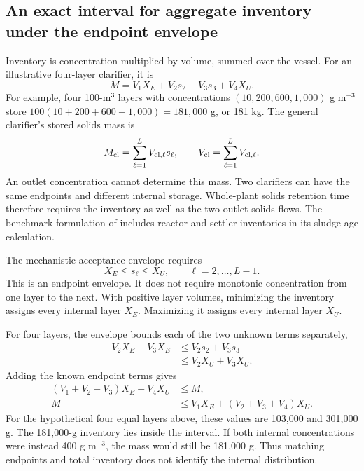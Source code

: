 \subsection{An exact interval for aggregate inventory under the endpoint envelope}

Inventory is concentration multiplied by volume, summed over the vessel. For an illustrative four-layer clarifier, it is
\begin{equation}
M=V_1X_E+V_2s_2+V_3s_3+V_4X_U.
\end{equation}
For example, four 100-m$^3$ layers with concentrations $(10,200,600,1{,}000)$ g m$^{-3}$ store $100(10+200+600+1{,}000)=181{,}000$ g, or 181 kg. The general clarifier's stored solids mass is
\begin{equation}
M_{\rm cl}=\sum_{\ell=1}^{L}V_{{\rm cl},\ell}s_\ell,\qquad
V_{\rm cl}=\sum_{\ell=1}^{L}V_{{\rm cl},\ell}.
\label{eq:plant_inventory_definition}
\end{equation}
An outlet concentration cannot determine this mass. Two clarifiers can have the same endpoints and different internal storage. Whole-plant solids retention time therefore requires the inventory as well as the two outlet solids flows. The benchmark formulation of \citet{Alex2008} includes reactor and settler inventories in its sludge-age calculation.

The mechanistic acceptance envelope requires
\begin{equation}
X_E\le s_\ell\le X_U,\qquad \ell=2,\ldots,L-1.
\label{eq:plant_layer_envelope}
\end{equation}
This is an endpoint envelope. It does not require monotonic concentration from one layer to the next. With positive layer volumes, minimizing the inventory assigns every internal layer $X_E$. Maximizing it assigns every internal layer $X_U$.

For four layers, the envelope bounds each of the two unknown terms separately,
\begin{align}
V_2X_E+V_3X_E&\le V_2s_2+V_3s_3\\
&\le V_2X_U+V_3X_U.
\end{align}
Adding the known endpoint terms gives
\begin{align}
(V_1+V_2+V_3)X_E+V_4X_U&\le M,\\
M&\le V_1X_E+(V_2+V_3+V_4)X_U.
\end{align}
For the hypothetical four equal layers above, these values are 103{,}000 and 301{,}000 g. The 181{,}000-g inventory lies inside the interval. If both internal concentrations were instead 400 g m$^{-3}$, the mass would still be 181{,}000 g. Thus matching endpoints and total inventory does not identify the internal distribution.

